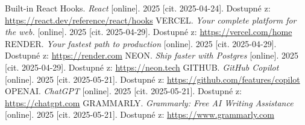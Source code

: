 \documentclass[twoside]{ctuthesis}
\begin{document}
\begin{thebibliography}{1}
Built-in React Hooks. \emph{React} [online]. 2025 [cit. 2025-04-24]. Dostupné z: \url{https://react.dev/reference/react/hooks}
VERCEL. \emph{Your complete platform for the web.} [online]. 2025 [cit. 2025-04-29]. Dostupné z: \url{https://vercel.com/home}
RENDER. \emph{Your fastest path to production} [online]. 2025 [cit. 2025-04-29]. Dostupné z: \url{https://render.com}
NEON. \emph{Ship faster with Postgres} [online]. 2025 [cit. 2025-04-29]. Dostupné z: \url{https://neon.tech}
GITHUB. \emph{GitHub Copilot} [online]. 2025 [cit. 2025-05-21]. Dostupné z: \url{https://github.com/features/copilot}
OPENAI. \emph{ChatGPT} [online]. 2025 [cit. 2025-05-21]. Dostupné z: \url{https://chatgpt.com}
GRAMMARLY. \emph{Grammarly: Free AI Writing Assistance} [online]. 2025 [cit. 2025-05-21]. Dostupné z: \url{https://www.grammarly.com}

\end{thebibliography}
\end{document}
